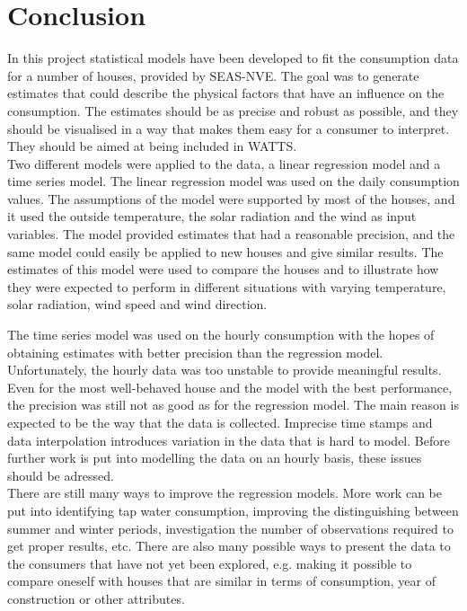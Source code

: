 \chapter{Conclusion}
In this project statistical models have been developed to fit the consumption data for a number of houses, provided by SEAS-NVE. The goal was to generate estimates that could describe the physical factors that have an influence on the consumption. The estimates should be as precise and robust as possible, and they should be visualised in a way that makes them easy for a consumer to interpret. They should be aimed at being included in WATTS. \\

\noindent Two different models were applied to the data, a linear regression model and a time series model. The linear regression model was used on the daily consumption values. The assumptions of the model were supported by most of the houses, and it used the outside temperature, the solar radiation and the wind as input variables. The model provided estimates that had a reasonable precision, and the same model could easily be applied to new houses and give similar results. The estimates of this model were used to compare the houses and to illustrate how they were expected to perform in different situations with varying temperature, solar radiation, wind speed and wind direction. 

\noindent The time series model was used on the hourly consumption with the hopes of obtaining estimates with better precision than the regression model. Unfortunately, the hourly data was too unstable to provide meaningful results. Even for the most well-behaved house and the model with the best performance, the precision was still not as good as for the regression model. The main reason is expected to be the way that the data is collected. Imprecise time stamps and data interpolation introduces variation in the data that is hard to model. Before further work is put into modelling the data on an hourly basis, these issues should be adressed. \\

\noindent There are still many ways to improve the regression models. More work can be put into identifying tap water consumption, improving the distinguishing between summer and winter periods, investigation the number of observations required to get proper results, etc. There are also many possible ways to present the data to the consumers that have not yet been explored, e.g. making it possible to compare oneself with houses that are similar in terms of consumption, year of construction or other attributes.

